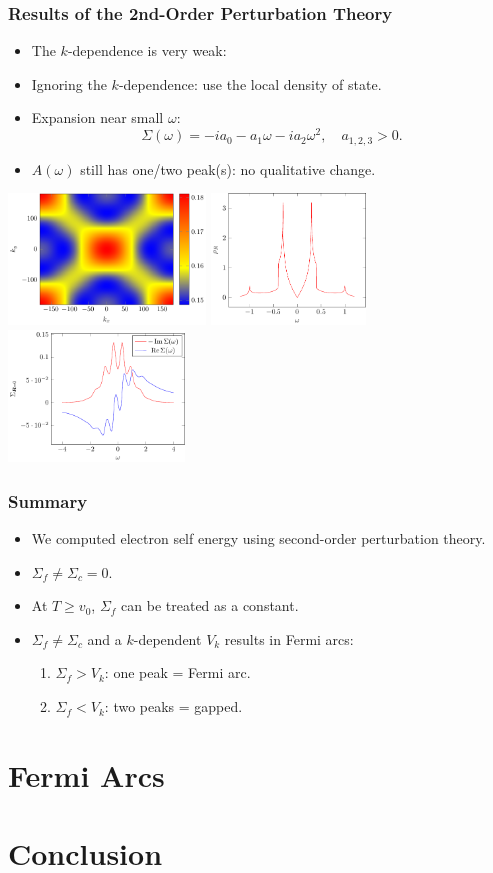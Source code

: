 \documentclass[xcolor=table, 10pt, aspectratio=169]{beamer}
\begin{document}
\begin{frame}
\frametitle{Results of the 2nd-Order Perturbation Theory}
\begin{itemize}
\item The $k$-dependence is very weak:
\item Ignoring the $k$-dependence: use the local density of state.
\item Expansion near small $\omega$:
\[\Sigma(\omega) = -ia_0-a_1\omega-ia_2\omega^2,\quad
a_{1,2,3}>0.\]
\item $A(\omega)$ still has one/two peak(s): no qualitative change.
\end{itemize}
\begin{center}
\includegraphics[height=3.5cm]{gammak_v1}
\includegraphics[height=3.5cm]{rho_dwave0}
\includegraphics[height=3.5cm]{ims_dwave}
\end{center}
\end{frame}

\begin{frame}
\frametitle{Summary}
\begin{itemize}
\item<1-4> We computed electron self energy using second-order perturbation theory.
\item<2-6> $\Sigma_f\neq\Sigma_c=0$.
\item<3-5> At $T\geq v_0$, $\Sigma_f$ can be treated as a constant.
\item<4-7> $\Sigma_f\neq\Sigma_c$ and a $k$-dependent $V_k$ results in Fermi arcs:
\begin{enumerate}
\item $\Sigma_f>V_k$: one peak = Fermi arc.
\item $\Sigma_f<V_k$: two peaks = gapped.
\end{enumerate}
\end{itemize}
\end{frame}

\section{Fermi Arcs}

\section{Conclusion}
\end{document}
